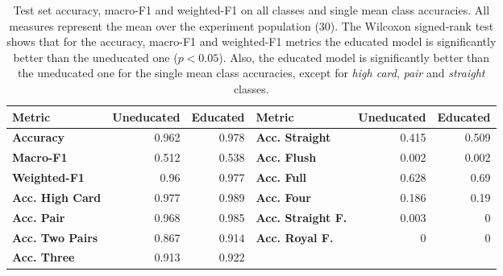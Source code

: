 
\begin{table}
    \centering
     \begin{adjustbox}{width=\linewidth,center}
         \begin{tabular}{l|rr||l|rr}
             \textbf{Metric} & \textbf{Uneducated} & \textbf{Educated} & \textbf{Metric} & \textbf{Uneducated} & \textbf{Educated}
             \\
             \hline\hline
             \textbf{Accuracy} & 0.962 & 0.978 & \textbf{Acc. Straight} & 0.415 & 0.509
             \\
             \textbf{Macro-F1} & 0.512 & 0.538 & \textbf{Acc. Flush} & 0.002 & 0.002
             \\
             \textbf{Weighted-F1} & 0.96 & 0.977 & \textbf{Acc. Full} & 0.628 & 0.69
             \\
             \textbf{Acc. High Card} & 0.977 & 0.989 & \textbf{Acc. Four} & 0.186 & 0.19
             \\
             \textbf{Acc. Pair} & 0.968 & 0.985 & \textbf{Acc. Straight F.} & 0.003 & 0
             \\
             \textbf{Acc. Two Pairs} & 0.867 & 0.914 & \textbf{Acc. Royal F.} & 0 & 0
             \\
             \textbf{Acc. Three} & 0.913 & 0.922 & & &
        \end{tabular}
     \end{adjustbox}
    \caption[Results of the poker hand classification experiment with KILL]{
        Test set accuracy, macro-F1 and weighted-F1 on all classes and single mean class accuracies.
        All measures represent the mean over the experiment population (30).
        The Wilcoxon signed-rank test shows that for the accuracy, macro-F1 and weighted-F1 metrics the educated model is significantly better than the uneducated one ($p < 0.05$).
        Also, the educated model is significantly better than the uneducated one for the single mean class accuracies, except for \emph{high card}, \emph{pair} and \emph{straight} classes.
    }
    \label{tab:phds-kill-results}
\end{table}